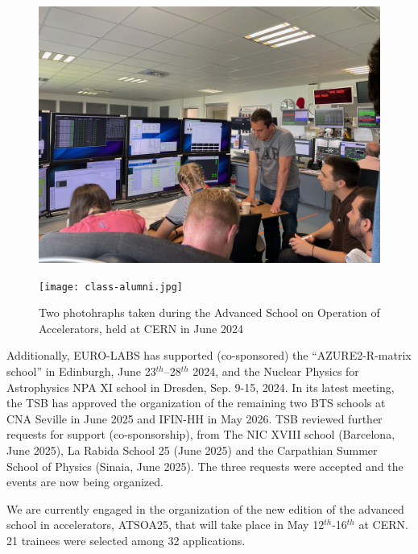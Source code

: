 \begin{figure}
    \centering
\begin{minipage}{0.49\textwidth}
        \centering
        \includegraphics[width=\textwidth]{sections/ISOLDE-class.jpg}
    \end{minipage}
    \hfill %
    \begin{minipage}{0.49\textwidth}
        \centering
        \texttt{[image: class-alumni.jpg]}
    \end{minipage}   
 \caption{Two photohraphs taken during the Advanced School on Operation of Accelerators, held at CERN in June  2024 }
    \label{fig:ATSOA24}
\end{figure}


Additionally, EURO-LABS has supported (co-sponsored) the “AZURE2-R-matrix school” in Edinburgh, June  23$^{th}$–28$^{th}$ 2024, and the Nuclear Physics for Astrophysics NPA XI school in Dresden, Sep. 9-15, 2024. In its latest meeting, the TSB has approved the organization of the remaining two BTS schools at CNA Seville in June 2025 and IFIN-HH in May 2026. TSB reviewed further requests for support (co-sponsorship), from The NIC XVIII school (Barcelona, June 2025), La Rabida School 25 (June 2025) and the Carpathian Summer School of Physics (Sinaia, June 2025). The three requests were accepted and the events are now being organized.


We are currently engaged in the organization of the new edition 
of the advanced school in accelerators, ATSOA25, that will take place in May 12$^{th}$-16$^{th}$ at CERN. 
21 trainees were selected among 32 applications. %

